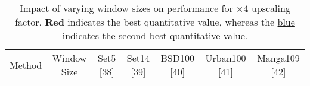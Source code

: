 \documentclass[journal]{IEEEtran}
\begin{document}
\begin{table*} 
\centering
\caption{Impact of varying window sizes on performance for $\times$4 upscaling factor. {\color{red}\textbf{Red}} indicates the best quantitative value, whereas the {\color{blue}\underline{blue}} indicates the second-best quantitative value.}
\label{table5}
\setlength{\tabcolsep}{3pt}

\begin{tabular}{|c|c|cc|cc|cc|cc|cc|}
  \hline
  \multirow{2}{*}{Method} & \multirow{2}{*}{Window Size} & \multicolumn{2}{c|}{Set5 [38]} & \multicolumn{2}{c|}{Set14 [39]} & \multicolumn{2}{c|}{BSD100 [40]} & \multicolumn{2}{c|}{Urban100 [41]} & \multicolumn{2}{c|}{Manga109 [42]}   \\
  

\end{tabular}
\end{table*}
\end{document}
